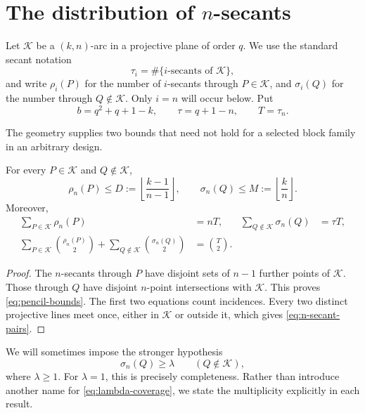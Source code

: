 \section{The distribution of \texorpdfstring{\(n\)}{n}-secants}
\label{sec:n-secants}

Let \(\mathcal K\) be a \((k,n)\)-arc in a projective plane of order \(q\).
We use the standard secant notation
\[
 \tau_i=\#\{\text{\(i\)-secants of \(\mathcal K\)}\},
\]
and write \(\rho_i(P)\) for the number of \(i\)-secants through
\(P\in\mathcal K\), and \(\sigma_i(Q)\) for the number through
\(Q\notin\mathcal K\).  Only \(i=n\) will occur below.  Put
\[
 b=q^2+q+1-k,\qquad \tau=q+1-n,\qquad T=\tau_n.
\]

The geometry supplies two bounds that need not hold for a selected block
family in an arbitrary design.

\begin{lemma}\label{lem:pencil-bounds}
For every \(P\in\mathcal K\) and \(Q\notin\mathcal K\),
\begin{equation}\label{eq:pencil-bounds}
 \rho_n(P)\le D:=\left\lfloor\frac{k-1}{n-1}\right\rfloor,
 \qquad
 \sigma_n(Q)\le M:=\left\lfloor\frac{k}{n}\right\rfloor.
\end{equation}
Moreover,
\begin{align}
 \sum_{P\in\mathcal K}\rho_n(P)&=nT,&
 \sum_{Q\notin\mathcal K}\sigma_n(Q)&=\tau T,
 \label{eq:n-secant-incidences}\\
 \sum_{P\in\mathcal K}\binom{\rho_n(P)}2
 +\sum_{Q\notin\mathcal K}\binom{\sigma_n(Q)}2&=\binom T2.
 \label{eq:n-secant-pairs}
\end{align}
\end{lemma}

\begin{proof}
The \(n\)-secants through \(P\) have disjoint sets of \(n-1\) further
points of \(\mathcal K\).  Those through \(Q\) have disjoint \(n\)-point
intersections with \(\mathcal K\).  This proves \eqref{eq:pencil-bounds}.
The first two equations count incidences.  Every two distinct projective lines
meet once, either in \(\mathcal K\) or outside it, which gives
\eqref{eq:n-secant-pairs}.
\end{proof}

We will sometimes impose the stronger hypothesis
\begin{equation}\label{eq:lambda-coverage}
 \sigma_n(Q)\ge\lambda\qquad(Q\notin\mathcal K),
\end{equation}
where \(\lambda\ge1\).  For \(\lambda=1\), this is precisely completeness.
Rather than introduce another name for \eqref{eq:lambda-coverage}, we state
the multiplicity explicitly in each result.

